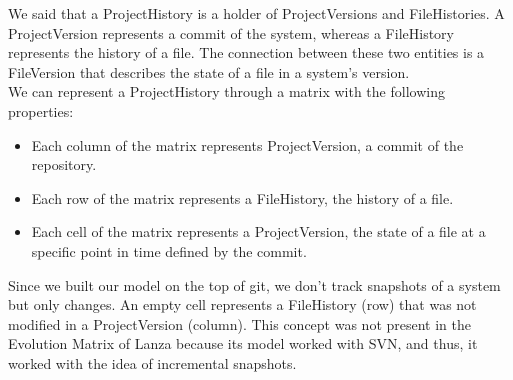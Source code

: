 We said that a ProjectHistory is a holder of ProjectVersions and FileHistories. 
A ProjectVersion represents a commit of the system, whereas a FileHistory represents the history of a file. 
The connection between these two entities is a FileVersion that describes the state of a file in a system's version. \\
We can represent a ProjectHistory through a matrix with the following properties: 
\begin{itemize}
    \item Each column of the matrix represents ProjectVersion, a commit of the repository. 
    \item Each row of the matrix represents a FileHistory, the history of a file. 
    \item Each cell of the matrix represents a ProjectVersion, the state of a file at a specific point in time defined by the commit. 
\end{itemize}

Since we built our model on the top of git, we don't track snapshots of a system but only changes. 
An empty cell represents a FileHistory (row) that was not modified in a ProjectVersion (column). 
This concept was not present in the Evolution Matrix of Lanza because its model worked with SVN, and thus, it worked with the idea of incremental snapshots.  

